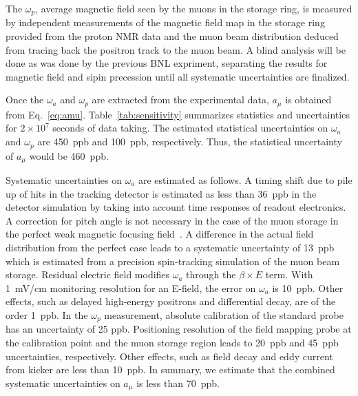 The $\omega_p$, average magnetic field seen by the muons in the storage ring, is 
measured by independent measurements of the magnetic field map in the storage ring provided from the proton
NMR data and the muon beam distribution deduced from tracing back the positron track to the muon beam.
A blind analysis will be done as was done by the previous BNL expriment, separating the results for 
magnetic field and sipin precession until all systematic uncertainties are finalized.

Once the $\omega_a$ and $\omega_p$ are extracted from the experimental
data, $a_\mu$ is obtained from Eq.~\ref{eq:amu}.
Table~\ref{tab:sensitivity} summarizes statistics and uncertainties for $2 \times 10^7$ seconds of data taking.
The estimated statistical uncertainties on $\omega_a$ and $\omega_p$ are 450~ppb and 100~ppb,
respectively. Thus, the statistical uncertainty of $a_{\mu}$ would be 460~ppb.

Systematic uncertainties on $\omega_a$ are estimated as follows.
A timing shift due to pile up of hits in the tracking detector is estimated as less than 36~ppb
in the detector simulation by taking into account time responses of readout electronics.
A correction for pitch angle is not necessary in the case of the muon storage 
in the perfect weak magnetic focusing field~\cite{Semertzidis:2016kte}. 
A difference in the actual field distribution 
from the perfect case leads to a systematic uncertainty of 13~ppb which is estimated from a precision spin-tracking simulation
of the muon beam storage.
Residual electric field modifies $\omega_a$ through the $\beta \times E$ term. 
With 1~mV/cm monitoring resolution for an E-field, the error on $\omega_a$ is 10~ppb. 
Other effects, such as delayed high-energy positrons and differential decay, are 
of the order 1~ppb.
 In the $\omega_p$ measurement, absolute calibration of the standard probe has an uncertainty of 25 ppb.
Positioning resolution of the field mapping probe at the calibration point and the muon storage
region leads to 20~ppb and 45~ppb uncertainties, respectively.
Other effects, such as field decay and eddy current from kicker are less than 10~ppb.
In summary, we estimate that the combined systematic uncertainties on $a_{\mu}$ is less than 70~ppb.

